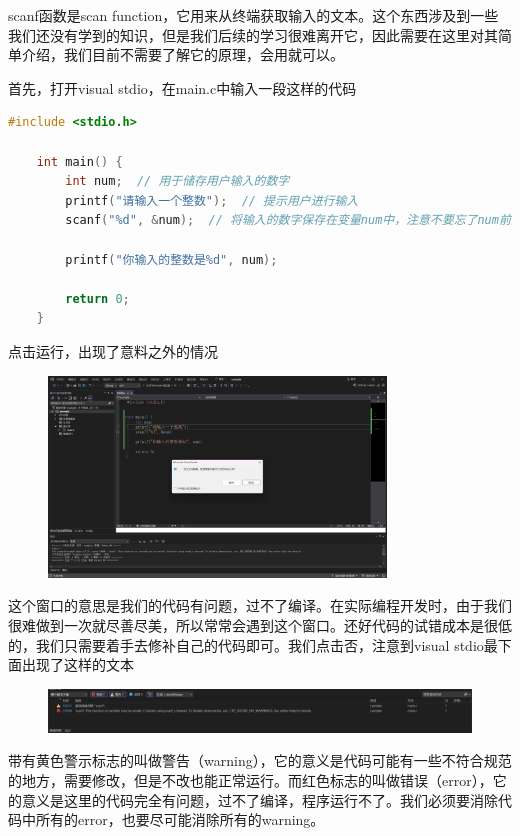 scanf函数是scan function，它用来从终端获取输入的文本。这个东西涉及到一些我们还没有学到的知识，但是我们后续的学习很难离开它，因此需要在这里对其简单介绍，我们目前不需要了解它的原理，会用就可以。

首先，打开visual stdio，在main.c中输入一段这样的代码

\begin{lstlisting}[language=C]
    #include <stdio.h>

    int main() {
        int num;  // 用于储存用户输入的数字
        printf("请输入一个整数");  // 提示用户进行输入
        scanf("%d", &num);  // 将输入的数字保存在变量num中，注意不要忘了num前的&

        printf("你输入的整数是%d", num);

        return 0;
    }
\end{lstlisting}

点击运行，出现了意料之外的情况

\begin{figure}[ht]
    \centering
    \includegraphics[width=0.8\textwidth, height=0.4\textheight]{images/1标准输入报错.png}
\end{figure}

这个窗口的意思是我们的代码有问题，过不了编译。在实际编程开发时，由于我们很难做到一次就尽善尽美，所以常常会遇到这个窗口。还好代码的试错成本是很低的，我们只需要着手去修补自己的代码即可。我们点击否，注意到visual stdio最下面出现了这样的文本

\begin{figure}[ht]
    \centering
    \includegraphics[width=\textwidth, height=0.2\textheight]{images/1ide错误提示.png}
\end{figure}

带有黄色警示标志的叫做警告（warning），它的意义是代码可能有一些不符合规范的地方，需要修改，但是不改也能正常运行。而红色标志的叫做错误（error），它的意义是这里的代码完全有问题，过不了编译，程序运行不了。我们必须要消除代码中所有的error，也要尽可能消除所有的warning。


